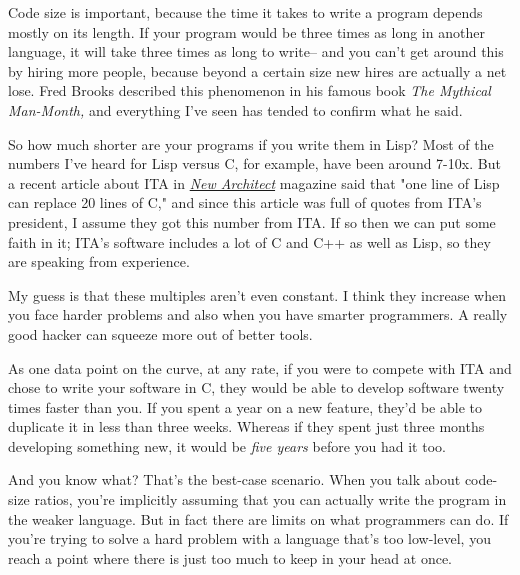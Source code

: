Code size is
                  important, because the time it takes to write a program
                  depends mostly on its length. If your program would be three
                  times as long in another language, it will take three times as
                  long to write-- and you can't get around this by hiring more
                  people, because beyond a certain size new hires are actually a
                  net lose. Fred Brooks described this phenomenon in his famous
                  book \emph{The Mythical Man-Month,} and everything I've seen
                  has tended to confirm what he said.

So how much
                  shorter are your programs if you write them in Lisp? Most of
                  the numbers I've heard for Lisp versus C, for example, have
                  been around 7-10x. But a recent article about ITA in
                  \href{http://www.newarchitectmag.com/documents/s=2286/new1015626014044/}{\emph{New Architect}}
                  magazine said that "one line of Lisp can replace 20 lines of
                  C," and since this article was full of quotes from ITA's
                  president, I assume they got this number from ITA. If so then
                  we can put some faith in it; ITA's software includes a lot of
                  C and C++ as well as Lisp, so they are speaking from
                  experience.

My guess is that these multiples aren't
                  even constant. I think they increase when you face harder
                  problems and also when you have smarter programmers. A really
                  good hacker can squeeze more out of better tools.

As
                  one data point on the curve, at any rate, if you were to
                  compete with ITA and chose to write your software in C, they
                  would be able to develop software twenty times faster than
                  you. If you spent a year on a new feature, they'd be able to
                  duplicate it in less than three weeks. Whereas if they spent
                  just three months developing something new, it would be
                  \emph{five years} before you had it too.

And you
                  know what? That's the best-case scenario. When you talk about
                  code-size ratios, you're implicitly assuming that you can
                  actually write the program in the weaker language. But in fact
                  there are limits on what programmers can do. If you're trying
                  to solve a hard problem with a language that's too low-level,
                  you reach a point where there is just too much to keep in your
                  head at once.

